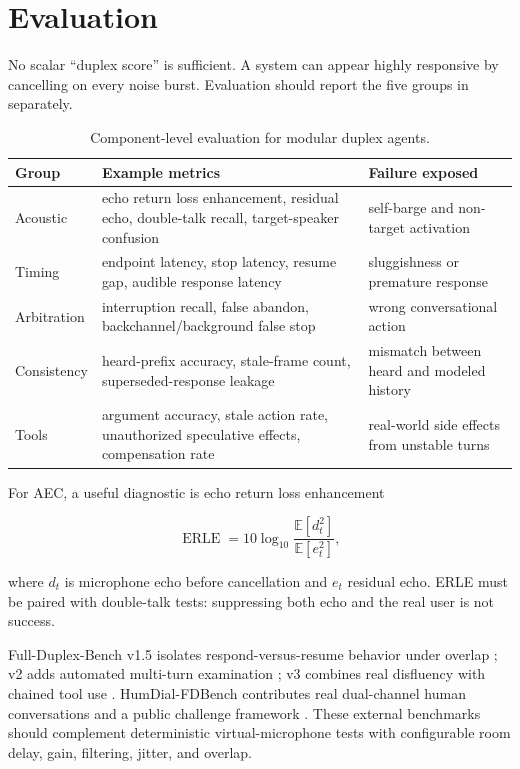 \documentclass[11pt]{article}
\begin{document}
\section{Evaluation}

No scalar ``duplex score'' is sufficient. A system can appear highly responsive
by cancelling on every noise burst. Evaluation should report the five groups in
 separately.

\begin{table}[ht]
\centering
\caption{Component-level evaluation for modular duplex agents.}
\label{tab:metrics}
\begin{tabularx}{\textwidth}{@{}P{0.18\textwidth}Y Y@{}}
\toprule
Group & Example metrics & Failure exposed \\
\midrule
Acoustic & echo return loss enhancement, residual echo, double-talk recall, target-speaker confusion & self-barge and non-target activation \\
Timing & endpoint latency, stop latency, resume gap, audible response latency & sluggishness or premature response \\
Arbitration & interruption recall, false abandon, backchannel/background false stop & wrong conversational action \\
Consistency & heard-prefix accuracy, stale-frame count, superseded-response leakage & mismatch between heard and modeled history \\
Tools & argument accuracy, stale action rate, unauthorized speculative effects, compensation rate & real-world side effects from unstable turns \\
\bottomrule
\end{tabularx}
\end{table}

For AEC, a useful diagnostic is echo return loss enhancement

\begin{equation}
  \operatorname{ERLE}=10\log_{10}
  \frac{\mathbb E[d_t^2]}{\mathbb E[e_t^2]},
  \label{eq:erle}
\end{equation}

where $d_t$ is microphone echo before cancellation and $e_t$ residual echo.
ERLE must be paired with double-talk tests: suppressing both echo and the real
user is not success.

Full-Duplex-Bench v1.5 isolates respond-versus-resume behavior under overlap
\citep{lin2025fdb15}; v2 adds automated multi-turn examination
\citep{lin2025fdb2}; v3 combines real disfluency with chained tool use
\citep{lin2026fdb3}. HumDial-FDBench contributes real dual-channel human
conversations and a public challenge framework \citep{wang2026humdial}. These
external benchmarks should complement deterministic virtual-microphone tests
with configurable room delay, gain, filtering, jitter, and overlap.
\end{document}
